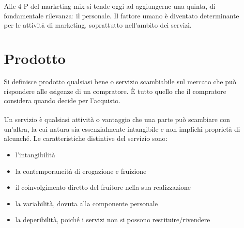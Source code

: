 Alle 4 P del marketing mix si tende oggi ad  aggiungerne una quinta, di fondamentale rilevanza: il personale. Il fattore umano è diventato determinante per le attività di marketing, soprattutto nell'ambito dei servizi. 

\section{Prodotto}
Si definisce prodotto qualsiasi bene o servizio scambiabile sul mercato che può rispondere alle esigenze di un compratore. È tutto quello che il compratore considera quando decide per l’acquisto.
\\
\\
Un servizio è qualsiasi attività o vantaggio che una parte può scambiare con un’altra, la cui natura sia essenzialmente intangibile e non implichi proprietà di alcunché.
Le caratteristiche distintive del servizio sono:
\begin{itemize}
	\item l’intangibilità
	\item la contemporaneità di erogazione e fruizione
	\item il coinvolgimento diretto del fruitore nella sua realizzazione
	\item la variabilità, dovuta alla componente personale
	\item la deperibilità, poiché i servizi non si possono restituire/rivendere
\end{itemize}


